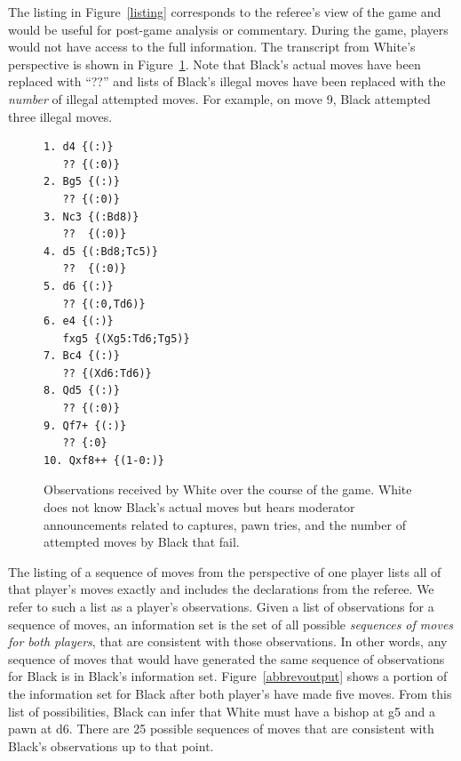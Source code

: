 \documentclass[10pt, conference, compsocconf]{IEEEtran}
\begin{document}
The listing in Figure~\ref{listing} corresponds to the referee's view of the game and would be useful for
post-game analysis or commentary.  During the game, players would not have access to the full information.  The
transcript from White's perspective is shown in Figure~\ref{filteredlisting}.  Note that Black's actual moves have been
replaced with ``??'' and lists of Black's illegal moves have been replaced with the {\em number} of illegal attempted
moves.  For example, on move 9, Black attempted three illegal moves.
\begin{figure}
\begin{verbatim}
1. d4 {(:)}
   ?? {(:0)}
2. Bg5 {(:)}
   ?? {(:0)}
3. Nc3 {(:Bd8)}
   ??  {(:0)}
4. d5 {(:Bd8;Tc5)}
   ??  {(:0)}
5. d6 {(:)}
   ?? {(:0,Td6)}
6. e4 {(:)}
   fxg5 {(Xg5:Td6;Tg5)}
7. Bc4 {(:)}
   ?? {(Xd6:Td6)}
8. Qd5 {(:)}
   ?? {(:0)}
9. Qf7+ {(:)} 
   ?? {:0}
10. Qxf8++ {(1-0:)}
\end{verbatim}
\caption{Observations received by White over the course of the game.  White does not know Black's actual moves but hears moderator announcements related to captures, pawn tries, and the number of attempted moves by Black that fail.}
\label{filteredlisting}
\end{figure}

The listing of a sequence of moves from the perspective of one player lists all of that player's moves exactly and
includes the declarations from the referee.  We refer to such a list as a player's observations.  Given a list of
observations for a sequence of moves, an information set is the set of all possible {\em sequences of moves for both
players}, that are consistent with those observations.  In other words, any sequence of moves that would have generated
the same sequence of observations for Black is in Black's information set.  Figure~\ref{abbrevoutput} shows a portion of the
information set for Black after both player's have made five moves.  From this list of possibilities, Black can infer
that White must have a bishop at g5 and a pawn at d6.  There are 25 possible sequences of moves that are consistent with
Black's observations up to that point. 
\end{document}
